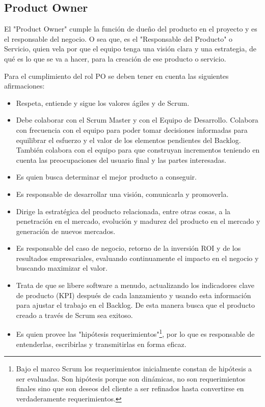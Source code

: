 \subsection{Product Owner}

El "Product Owner" cumple la función de dueño del producto en el proyecto y es el responsable del negocio. O sea que, es el "Responsable del Producto" o Servicio, quien vela por que el equipo tenga una visión clara y una estrategia, de qué es lo que se va a hacer, para la creación de ese producto o servicio.

Para el cumplimiento del rol PO se deben tener en cuenta las siguientes afirmaciones:

\begin{itemize}
\item Respeta, entiende y sigue los valores ágiles y de Scrum.
\item Debe colaborar con el Scrum Master y con el Equipo de Desarrollo. Colabora con frecuencia con el equipo para poder tomar decisiones informadas para equilibrar el esfuerzo y el valor de los elementos pendientes del Backlog. También colabora con el equipo para que construyan incrementos teniendo en cuenta las preocupaciones del usuario final y las partes interesadas.
\item Es quien busca determinar el mejor producto a conseguir.
\item Es responsable de desarrollar una visión, comunicarla y promoverla.
\item Dirige la estratégica del producto relacionada, entre otras cosas, a la penetración en el mercado, evolución y madurez del producto en el mercado y generación de nuevos mercados.
\item Es responsable del caso de negocio, retorno de la inversión ROI y de los resultados empresariales, evaluando continuamente el impacto en el negocio y buscando maximizar el valor.
\item Trata de que se libere software a menudo, actualizando los indicadores clave de producto (KPI) después de cada lanzamiento y usando esta información para ajustar el trabajo en el Backlog. De esta manera busca que el producto creado a través de Scrum sea exitoso.
\item Es quien provee las "hipótesis requerimientos"\footnote{Bajo el marco Scrum los requerimientos inicialmente constan de hipótesis a ser evaluadas. Son hipótesis porque son dinámicas, no son requerimientos finales sino que son deseos del cliente a ser refinados hasta convertirse en verdaderamente requerimientos.}, por lo que es responsable de entenderlas, escribirlas y transmitirlas en forma eficaz.

\end{itemize}
